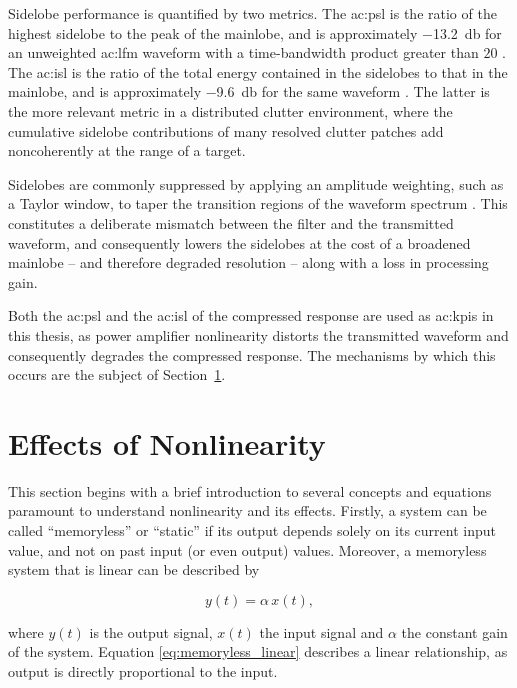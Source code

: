 Sidelobe performance is quantified by two metrics. The \gls{ac:psl} is the ratio of the highest sidelobe to the peak of the mainlobe, and is approximately \qty{-13.2}{\decibel} for an unweighted \gls{ac:lfm} waveform with a time-bandwidth product greater than $20$ \cite{pomr}. The \gls{ac:isl} is the ratio of the total energy contained in the sidelobes to that in the mainlobe, and is approximately \qty{-9.6}{\decibel} for the same waveform \cite{pomr}. The latter is the more relevant metric in a distributed clutter environment, where the cumulative sidelobe contributions of many resolved clutter patches add noncoherently at the range of a target.

Sidelobes are commonly suppressed by applying an amplitude weighting, such as a Taylor window, to taper the transition regions of the waveform spectrum \cite{pomr}. This constitutes a deliberate mismatch between the filter and the transmitted waveform, and consequently lowers the sidelobes at the cost of a broadened mainlobe -- and therefore degraded resolution -- along with a loss in processing gain.

Both the \gls{ac:psl} and the \gls{ac:isl} of the compressed response are used as \glspl{ac:kpi} in this thesis, as power amplifier nonlinearity distorts the transmitted waveform and consequently degrades the compressed response. The mechanisms by which this occurs are the subject of Section~\ref{sec:nonlinearity_effects}.

\section{Effects of Nonlinearity}\label{sec:nonlinearity_effects}

This section begins with a brief introduction to several concepts and equations paramount to understand nonlinearity and its effects. Firstly, a system can be called ``memoryless'' or ``static'' if its output depends solely on its current input value, and not on past input (or even output) values. Moreover, a memoryless system that is linear can be described by \cite{razavi}

\begin{equation}
  y(t) = \alpha \, x(t),
  \label{eq:memoryless_linear}
\end{equation}

where $y(t)$ is the output signal, $x(t)$ the input signal and $\alpha$ the constant gain of the system. Equation \eqref{eq:memoryless_linear} describes a linear relationship, as output is directly proportional to the input. 

